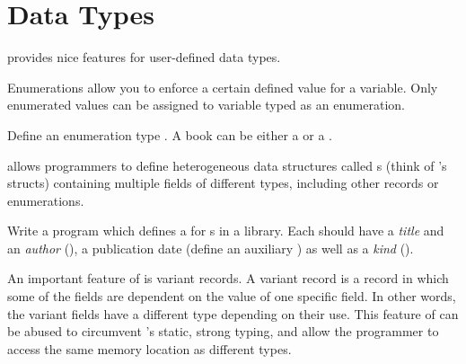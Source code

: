 \documentclass{../../tp}
\begin{document}
\section{Data Types}

\pascal provides nice features for user-defined data types. 

Enumerations allow you to enforce a certain defined value for a variable. Only enumerated values can be assigned to variable typed as an enumeration.

\begin{instruction}
	
Define an enumeration type . A book can be either a  or a .

\end{instruction}

\pascal allows programmers to define heterogeneous data structures called s (think of \C's structs) containing multiple fields of different types, including other records or enumerations.

\begin{instruction}
Write a program which defines a  for s in a library. Each  should have a \emph{title} and an \emph{author} (), a publication date (define an auxiliary ) as well as a \emph{kind} ().
\end{instruction}

An important feature of \pascal is variant records. A variant record is a record in which some of the fields are dependent on the value of one specific field. In other words, the variant fields have a different type depending on their use. This feature of \pascal can be abused to circumvent \pascal's static, strong typing, and allow the programmer to access the same memory location as different types. 
\end{document}
